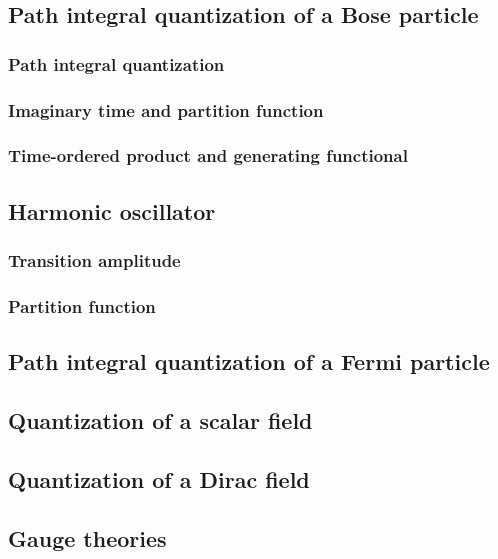 \documentclass[twoside]{amsart}
\begin{document}
\subsection{ Path integral quantization of a Bose particle}

\subsubsection{Path integral quantization}

\subsubsection{Imaginary time and partition function}

\subsubsection{Time-ordered product and generating functional }

\subsection{ Harmonic oscillator} 

\subsubsection{Transition amplitude}

\subsubsection{Partition function}

\subsection{ Path integral quantization of a Fermi particle }

\subsection{ Quantization of a scalar field}

\subsection{ Quantization of a Dirac field}

\subsection{ Gauge theories }
\end{document}

